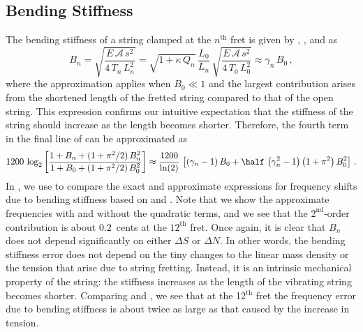 \subsection{Bending Stiffness\label{sct:model_stiffness}}
The bending stiffness of a string clamped at the $n^{\mathrm{th}}$ fret is given by , , and  as
\begin{equation} \label{eqn:bg_n_def}
  B_n = \sqrt{\frac{E\, \mathcal{A}\, s^2}{4\, T_n\, L_n^2}} = \sqrt{1 + \kappa\, Q_n}\, \frac{L_0}{L_n}\, \sqrt{\frac{E\, \mathcal{A}\, s^2}{4\, T_0\, L_0^2}} \approx \gamma_n\, B_0\, ,
\end{equation}
where the approximation applies when $B_0 \ll 1$ and the largest contribution arises from the shortened length of the fretted string compared to that of the open string. This expression confirms our intuitive expectation that the stiffness of the string should increase as the length becomes shorter.
Therefore, the fourth term in the final line of  can be approximated as
 \begin{equation} \label{eqn:dnu_bn}
1200\, \log_2 \left[ \frac{1 + B_n + (1 + \pi^2/2)\, B_n^2}{1 + B_0 + (1 + \pi^2/2)\, B_0^2} \right] \approx \frac{1200}{\ln(2)}\, \left[ \left(\gamma_n - 1\right) B_0 + \half\, \left(\gamma_n^2 - 1\right) \left(1 + \pi^2\right) B_0^2 \right]\, .
 \end{equation}
In , we use  to compare the exact and approximate expressions for frequency shifts due to bending stiffness based on   and . Note that we show the approximate frequencies with and without the quadratic terms, and we see that the $2^\mathrm{nd}$-order contribution is about $0.2$~cents at the $12^\mathrm{th}$ fret. Once again, it is clear that $B_n$ does not depend significantly on either $\Delta S$ or $\Delta N$. In other words, the bending stiffness error does not depend on the tiny changes to the linear mass density or the tension that arise due to string fretting. Instead, it is an intrinsic mechanical property of the string: the stiffness increases as the length of the vibrating string becomes shorter. Comparing  and , we see that at the 12$^\textrm{th}$ fret the frequency error due to bending stiffness is about twice as large as that caused by the increase in tension.

